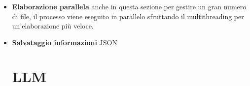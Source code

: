 \documentclass{article}
\begin{document}
\begin{itemize}
    \item \textbf{Elaborazione parallela} anche in questa sezione per gestire un gran numero di file, il processo viene eseguito in parallelo sfruttando il multithreading per un'elaborazione più veloce.

    \item \textbf{Salvataggio informazioni} JSON
    

\section{LLM}
    

    
\end{itemize}
\end{document}
